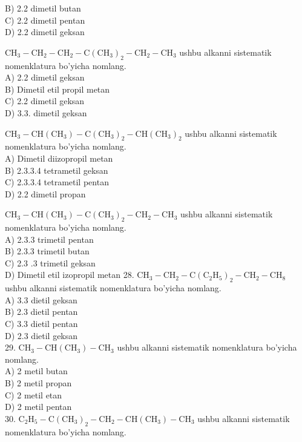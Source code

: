 B) 2.2 dimetil butan\\
C) 2.2 dimetil pentan\\
D) 2.2 dimetil geksan
  \item $\mathrm{CH}_{3}-\mathrm{CH}_{2}-\mathrm{CH}_{2}-\mathrm{C}\left(\mathrm{CH}_{3}\right)_{2}-\mathrm{CH}_{2}-\mathrm{CH}_{3}$ ushbu alkanni sistematik nomenklatura bo'yicha nomlang.\\
A) 2.2 dimetil geksan\\
B) Dimetil etil propil metan\\
C) 2.2 dimetil geksan\\
D) 3.3. dimetil geksan
  \item $\mathrm{CH}_{3}-\mathrm{CH}\left(\mathrm{CH}_{3}\right)-\mathrm{C}\left(\mathrm{CH}_{3}\right)_{2}-\mathrm{CH}\left(\mathrm{CH}_{3}\right)_{2}$ ushbu alkanni sistematik nomenklatura bo'yicha nomlang.\\
A) Dimetil diizopropil metan\\
B) 2.3.3.4 tetrametil geksan\\
C) 2.3.3.4 tetrametil pentan\\
D) 2.2 dimetil propan
  \item $\mathrm{CH}_{3}-\mathrm{CH}\left(\mathrm{CH}_{3}\right)-\mathrm{C}\left(\mathrm{CH}_{3}\right)_{2}-\mathrm{CH}_{2}-\mathrm{CH}_{3}$ ushbu alkanni sistematik nomenklatura bo'yicha nomlang.\\
A) 2.3.3 trimetil pentan\\
B) 2.3.3 trimetil butan\\
C) 2.3 .3 trimetil geksan\\
D) Dimetil etil izopropil metan
28. $\mathrm{CH}_{3}-\mathrm{CH}_{2}-\mathrm{C}\left(\mathrm{C}_{2} \mathrm{H}_{5}\right)_{2}-\mathrm{CH}_{2}-\mathrm{CH}_{8}$ ushbu alkanni sistematik nomenklatura bo'yicha nomlang.\\
A) 3.3 dietil geksan\\
B) 2.3 dietil pentan\\
C) 3.3 dietil pentan\\
D) 2.3 dietil geksan\\
29. $\mathrm{CH}_{3}-\mathrm{CH}\left(\mathrm{CH}_{3}\right)-\mathrm{CH}_{3}$ ushbu alkanni sistematik nomenklatura bo'yicha nomlang.\\
A) 2 metil butan\\
B) 2 metil propan\\
C) 2 metil etan\\
D) 2 metil pentan\\
30. $\mathrm{C}_{2} \mathrm{H}_{5}-\mathrm{C}\left(\mathrm{CH}_{3}\right)_{2}-\mathrm{CH}_{2}-\mathrm{CH}\left(\mathrm{CH}_{3}\right)-\mathrm{CH}_{3}$ ushbu alkanni sistematik nomenklatura bo'yicha nomlang.\\
